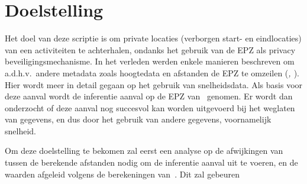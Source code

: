 \section{Doelstelling}
Het doel van deze scriptie is om private locaties (verborgen start- en
eindlocaties) van een activiteiten te achterhalen, ondanks het gebruik van de
EPZ als privacy beveiligingsmechanisme. In het verleden werden enkele manieren
beschreven om a.d.h.v.\ andere metadata zoals hoogtedata en afstanden de EPZ te
omzeilen (\textit{\citeauthor{Dhondt_Pochat_Voulimeneas_Joosen_Volckaert_2022},
    \citeauthor{Verdonck_2022}}). Hier wordt meer in detail gegaan op het gebruik
van snelheidsdata. Als basis voor deze aanval wordt de inferentie aanval op de
EPZ van~\citeauthor{Dhondt_Pochat_Voulimeneas_Joosen_Volckaert_2022} genomen.
Er wordt dan onderzocht of deze aanval nog succesvol kan worden uitgevoerd bij
het weglaten van gegevens, en dus door het gebruik van andere gegevens,
voornamelijk snelheid. \newline

Om deze doelstelling te bekomen zal eerst een analyse op de afwijkingen van
tussen de berekende afstanden nodig om de inferentie aanval uit te voeren, en
de waarden afgeleid volgens de berekeningen
van~\citeauthor{Dhondt_Pochat_Voulimeneas_Joosen_Volckaert_2022}. Dit zal gebeuren 